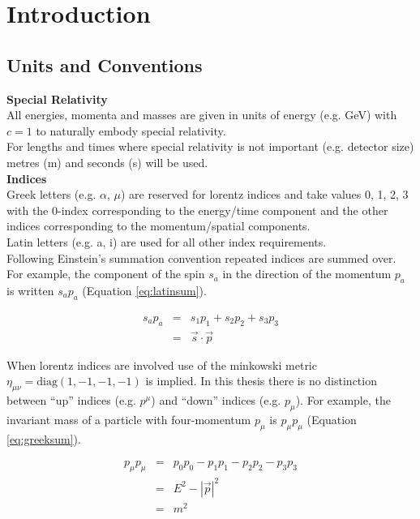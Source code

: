 \chapter{Introduction}

\section{Units and Conventions}

{\bf Special Relativity} \\

All energies, momenta and masses are given in units of energy (e.g. GeV) with
$c=1$ to naturally embody special relativity. \\

For lengths and times where special relativity is not important (e.g. detector
size) metres (m) and seconds (s) will be used. \\

{\bf Indices} \\

Greek letters (e.g. $\alpha$, $\mu$) are reserved for lorentz indices and take
values 0, 1, 2, 3 with the 0-index corresponding to the energy/time component
and the other indices corresponding to the momentum/spatial components. \\

Latin letters (e.g. a, i) are used for all other index requirements. \\

Following Einstein's summation convention repeated indices are summed over. For 
example, the component of the spin $s_{a}$ in the direction of the momentum 
$p_{a}$ is written $s_{a}p_{a}$ (Equation \ref{eq:latinsum}).

\begin{eqnarray}
s_{a}p_{a} &=& s_{1}p_{1} + s_{2}p_{2} + s_{3}p_{3} \nonumber \\
&=& \vec{s}\cdot\vec{p}
\label{eq:latinsum}
\end{eqnarray}

When lorentz indices are involved use of the minkowski metric $\eta_{\mu\nu} =
\mathrm{diag}(1, -1, -1, -1)$ is implied. In this thesis there is no distinction 
between ``up'' indices (e.g. $p^{\mu}$) and ``down'' indices (e.g. $p_{\mu}$). 
For example, the invariant mass of a particle with four-momentum $p_{\mu}$ is 
$p_{\mu}p_{\mu}$ (Equation \ref{eq:greeksum}). 

\begin{eqnarray}
p_{\mu}p_{\mu} &=& p_{0}p_{0} - p_{1}p_{1} - p_{2}p_{2} - p_{3}p_{3} \nonumber
\\
&=& E^{2} - |\vec{p}|^{2} \nonumber \\
&=& m^{2}
\label{eq:greeksum}
\end{eqnarray}

